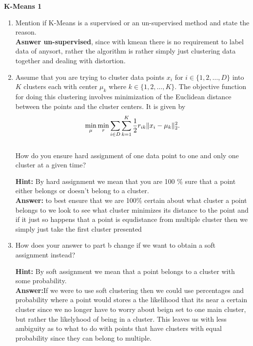 \begin{Q}
\textbf{\Large K-Means 1}\\

\begin{enumerate}

\item Mention if K-Means is a supervised or an un-supervised method and state the reason.\\
\textbf{Asnwer\: un-supervised}, since with kmean there is no requirement to label data of anysort, rather the algorithm is rather simply just clustering data together and dealing with distortion.

\item Assume that you are trying to cluster data points $x_{i}$  for $ i \in \{1,2, \dots, D\}$ into $K$ clusters each with center $\mu_{k}$  where $ k \in \{1,2, \dots, K \}$. The objective function for doing this clustering involves minimization of the Euclidean distance between the points and the cluster centers. It is given by  \begin{equation*}
\min\limits_{\mu} \min\limits_{r}\sum\limits_{i \in D} \sum\limits_{k =1}^{K} \frac{1}{2} r_{ik} \|x_{i} -\mu_{k}\|_{2}^{2}. \\
 \end{equation*} \\ How do you ensure hard assignment of one data point to one and only one cluster at a given time?
 
 \textbf{Hint:} By hard assignment we mean that you are 100 \% sure that a point either belongs or doesn't belong to a cluster.\\
\textbf{Answer:} to best ensure that we are 100\% certain about what cluster a point belongs to we look to see what cluster minimizes its distance to the point and if it just so happens that a point is equdistance from multiple cluster then we simply just take the first cluster presented
 
 \item How does your answer to part b change if we want to obtain a soft assignment instead?
 
 \textbf{Hint:} By soft assignment we mean that  a point  belongs to a cluster with some probability.\\
\textbf{Answer:}If we were to use soft clustering then we could use percentages and probability where a point would stores a the likelihood that its near a certain cluster since we no longer have to worry about beign set to one main cluster, but rather the likelyhood of being in a cluster. This leaves us with less ambiguity as to what to do with points that have clusters with equal probability since they can belong to multiple.
 

\end{enumerate}
\end{Q}
